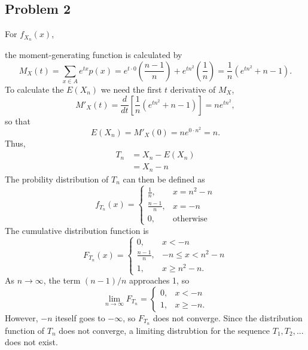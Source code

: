 \documentclass{article}
\begin{document}
\subsection*{Problem 2}
For $f_{X_n}(x)$, 
\iffalse
\[f_{X_n}(x) = \begin{dcases}
\frac{1}{n}, &x = n^2, \\
\frac{n-1}{n}, &x = 0, \\
0, &\textrm{otherwise}. 
\end{dcases}\]
\fi
the moment-generating function is calculated by \[M_X(t) = \sum_{x\in A}e^{tx}p(x) = e^{t\cdot 0}\left(\frac{n-1}{n}\right) + e^{tn^2}\left(\frac{1}{n}\right) = \frac{1}{n}\left(e^{tn^2} + n - 1\right).\] To calculate the $E(X_n)$ we need the first $t$ derivative of $M_X$, \[M'_X(t) = \frac{d}{dt}\left[\frac{1}{n}\left(e^{tn^2} + n - 1\right)\right] = ne^{tn^2},\] so that \[E(X_n) = M'_X(0) = ne^{0\cdot n^2} = n.\]
Thus,
\[\begin{aligned}
T_n &= X_n - E(X_n) \\
&= X_n - n
\end{aligned}\]
The probility distribution of $T_n$ can then be defined as 
\[f_{T_n}(x) = \begin{cases}
\frac{1}{n}, &x = n^2 - n \\
\frac{n-1}{n}, &x = -n \\
0, &\text{otherwise}
\end{cases}\]
The cumulative distribution function is 
\[F_{T_n}(x) = \begin{cases}
0, & x < -n \\
\frac{n-1}{n}, & -n \leq x < n^2 - n \\
1, &x \geq n^2 - n.
\end{cases}\]
As $n\to\infty$, the term $(n-1)/n$ approaches 1, so
\[\lim_{n\to\infty} F_{T_n} = \begin{cases}
0, &x < -n \\
1, &x \geq -n. \end{cases}\]
However, $-n$ iteself goes to $-\infty$, so $F_{T_n}$ does not converge. Since the distribution function of $T_n$ does not converge, a limiting distrubtion for the sequence $T_1, T_2, ...$ does not exist.

\iffalse
For $T_n = X_n - E(X_n)$, \[\lim_{n\to\infty} T_n = \lim_{n\to\infty} X_n - \lim_{n\to\infty} E(X_n).\] $E(X) = n$ therefore $E(X)$ approaches infinity. For $X_n$, the probability that $x=n^2$ is $1/n$ and approaches zero. The probability that $x=0$ approaches $1$. Then  \[\lim_{n\to\infty} T_n = \lim_{n\to\infty} X_n - \lim_{n\to\infty} E(X_n) = 0 - \infty = -\infty.\] Therefore, there is no limiting distribution for $f_X$. 
\fi
\end{document}
